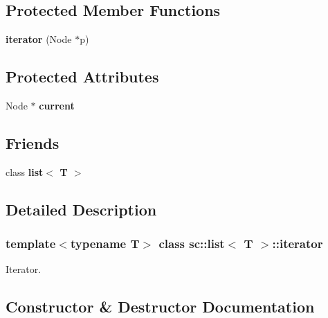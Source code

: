 \subsection*{Protected Member Functions}
\begin{DoxyCompactItemize}
\item 
\mbox{\label{classsc_1_1list_1_1iterator_a818795d7651516a93e563f3229e86351}} 
{\bfseries iterator} (Node $\ast$p)
\end{DoxyCompactItemize}
\subsection*{Protected Attributes}
\begin{DoxyCompactItemize}
\item 
\mbox{\label{classsc_1_1list_1_1iterator_a165fb1acaddae6f401cf352a451de1ed}} 
Node $\ast$ {\bfseries current}
\end{DoxyCompactItemize}
\subsection*{Friends}
\begin{DoxyCompactItemize}
\item 
\mbox{\label{classsc_1_1list_1_1iterator_ab6cf03d50c50087700b0fb872accfa7b}} 
class {\bfseries list$<$ T $>$}
\end{DoxyCompactItemize}


\subsection{Detailed Description}
\subsubsection*{template$<$typename T$>$\newline
class sc\+::list$<$ T $>$\+::iterator}

Iterator. 

\subsection{Constructor \& Destructor Documentation}
\mbox{\label{classsc_1_1list_1_1iterator_acd90feec03d8a2762f36407a27166bb9}} 

